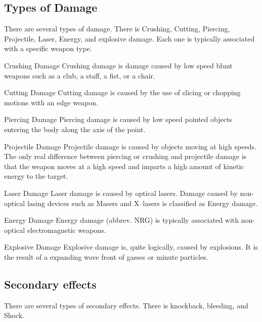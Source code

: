 \subsection{Types of Damage}

There are several types of damage. There is Crushing, Cutting,
Piercing, Projectile, Laser, Energy, and explosive damage. Each one
is typically associated with a specific weapon type.

\begin{relate}
	\item[Crushing Damage]
	Crushing damage is damage caused by low speed blunt weapons such as
	a club, a staff, a fist, or a chair.

	\item[Cutting Damage]
	Cutting damage is caused by the use of slicing or chopping motions
	with an edge weapon.

	\item[Piercing Damage]
	Piercing damage is caused by low speed pointed objects entering the
	body along the axis of the point.

	\item[Projectile Damage]
	Projectile damage is caused by objects moving at high speeds. The
	only real difference between piercing or crushing and projectile
	damage is that the weapon moves at a high speed and imparts a
	high amount of kinetic energy to the target.

	\item[Laser Damage]
	Laser damage is caused by optical lasers. Damage caused by
	non-optical lasing devices such as Masers and X--lasers is classified
	as Energy damage.

	\item[Energy Damage]
	Energy damage (abbrev. NRG) is typically associated with non-optical
	electromagnetic weapons.

	\item[Explosive Damage]
	Explosive damage is, quite logically, caused by explosions. It is
	the result of a expanding wave front of gasses or minute particles.

\end{relate}

\subsection{Secondary effects}

There are several types of secondary effects. There is knockback,
bleeding, and Shock.

